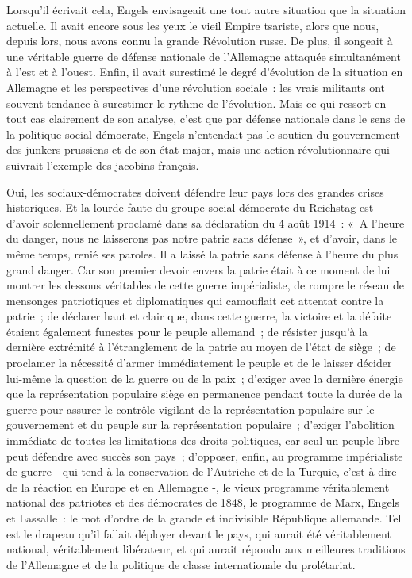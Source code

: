 \documentclass[french,twoside]{book} %
\begin{document}
\noindent Lorsqu’il écrivait cela, Engels envisageait une tout autre situation que la situation actuelle. Il avait encore sous les yeux le vieil Empire tsariste, alors que nous, depuis lors, nous avons connu la grande Révolution russe. De plus, il songeait à une véritable guerre de défense nationale de l’Allemagne attaquée simultanément à l’est et à l’ouest. Enfin, il avait surestimé le degré d’évolution de la situation en Allemagne et les perspectives d’une révolution sociale : les vrais militants ont souvent tendance à surestimer le rythme de l’évolution. Mais ce qui ressort en tout cas clairement de son analyse, c’est que par défense nationale dans le sens de la politique social-démocrate, Engels n’entendait pas le soutien du gouvernement des junkers prussiens et de son état-major, mais une action révolutionnaire qui suivrait l’exemple des jacobins français.\par
Oui, les sociaux-démocrates doivent défendre leur pays lors des grandes crises historiques. Et la lourde faute du groupe social-démocrate du Reichstag est d’avoir solennellement proclamé dans sa déclaration du 4 août 1914 : « A l’heure du danger, nous ne laisserons pas notre patrie sans défense », et d’avoir, dans le même temps, renié ses paroles. Il a laissé la patrie sans défense à l’heure du plus grand danger. Car son premier devoir envers la patrie était à ce moment de lui montrer les dessous véritables de cette guerre impérialiste, de rompre le réseau de mensonges patriotiques et diplomatiques qui camouflait cet attentat contre la patrie ; de déclarer haut et clair que, dans cette guerre, la victoire et la défaite étaient également funestes pour le peuple allemand ; de résister jusqu’à la dernière extrémité à l’étranglement de la patrie au moyen de l’état de siège ; de proclamer la nécessité d’armer immédiatement le peuple et de le laisser décider lui-même la question de la guerre ou de la paix ; d’exiger avec la dernière énergie que la représentation populaire siège en permanence pendant toute la durée de la guerre pour assurer le contrôle vigilant de la représentation populaire sur le gouvernement et du peuple sur la représentation populaire ; d’exiger l’abolition immédiate de toutes les limitations des droits politiques, car seul un peuple libre peut défendre avec succès son pays ; d’opposer, enfin, au programme impérialiste de guerre - qui tend à la conservation de l’Autriche et de la Turquie, c’est-à-dire de la réaction en Europe et en Allemagne -, le vieux programme véritablement national des patriotes et des démocrates de 1848, le programme de Marx, Engels et Lassalle : le mot d’ordre de la grande et indivisible République allemande. Tel est le drapeau qu’il fallait déployer devant le pays, qui aurait été véritablement national, véritablement libérateur, et qui aurait répondu aux meilleures traditions de l’Allemagne et de la politique de classe internationale du prolétariat.\par
\end{document}
